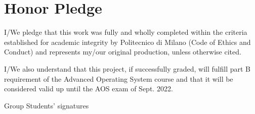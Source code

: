 \section{Honor Pledge}

I/We pledge that this work was fully and wholly completed within the criteria
established for academic integrity by Politecnico di Milano (Code of Ethics and
Conduct) and represents my/our original production, unless otherwise cited.

I/We also understand that this project, if successfully graded,  will fulfill part B requirement of the
Advanced Operating System course and that it will be considered valid up until
the AOS exam of Sept. 2022.

\begin{flushright}
    Group Students' signatures
\end{flushright}
